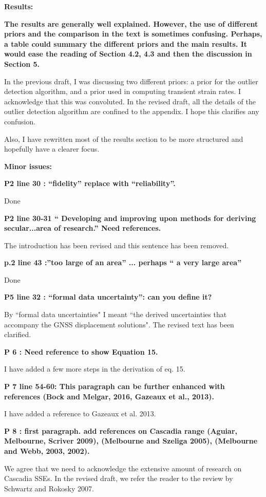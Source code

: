 \documentclass[10pt,a4paper]{letter}
\begin{document}
\begin{letter}{}
\textbf{Results:}

\textbf{The results are generally well explained. However, the use of
different priors and the comparison in the text is sometimes
confusing. Perhaps, a table could summary the different priors and the
main results. It would ease the reading of Section 4.2, 4.3 and then
the discussion in Section 5.}

In the previous draft, I was discussing two different priors: a prior
for the outlier detection algorithm, and a prior used in computing
transient strain rates. I acknowledge that this was convoluted. In the
revised draft, all the details of the outlier detection algorithm are
confined to the appendix. I hope this clarifies any confusion.

Also, I have rewritten most of the results section to be more
structured and hopefully have a clearer focus.

\textbf{Minor issues:}

\textbf{P2 line 30 : “fidelity” replace with “reliability”.}

Done

\textbf{P2 line 30-31 “ Developing and improving upon methods for deriving
secular...area of research.” Need references.}

The introduction has been revised and this sentence has been removed.

\textbf{p.2 line 43 :”too large of an area” ... perhaps “ a very large area”}

Done

\textbf{P5 line 32 : “formal data uncertainty”: can you define it?}

By ``formal data uncertainties" I meant ``the derived uncertainties that
accompany the GNSS displacement solutions". The revised text has been
clarified.

\textbf{P 6 : Need reference to show Equation 15.}

I have added a few more steps in the derivation of eq. 15.

\textbf{P 7 line 54-60: This paragraph can be further enhanced with references
(Bock and Melgar, 2016, Gazeaux et al., 2013).}

I have added a reference to Gazeaux et al. 2013.

\textbf{P 8 : first paragraph. add references on Cascadia range (Aguiar,
Melbourne, Scriver 2009), (Melbourne and Szeliga 2005), (Melbourne and
Webb, 2003, 2002).}

We agree that we need to acknowledge the extensive amount of research
on Cascadia SSEs. In the revised draft, we refer the reader to the
review by Schwartz and Rokosky 2007.


\end{letter}
\end{document}
